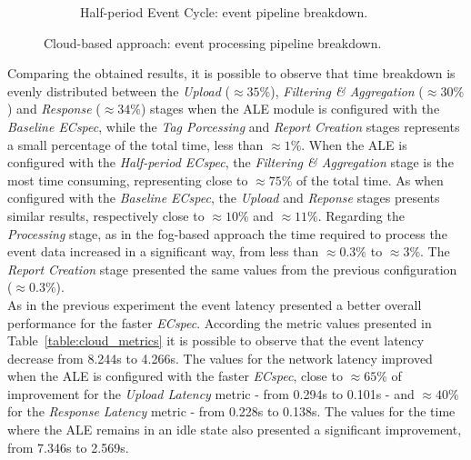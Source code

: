 \begin{figure}[ht!]
\begin{subfigure}{.5\textwidth}
    \caption{Half-period Event Cycle: event pipeline breakdown.}
    \label{fig:ecspecf_effective_half}
  \end{subfigure}
  \caption[Cloud-based approach: event processing breakdown.]{Cloud-based approach: event processing pipeline breakdown.}
  \label{fig:ecspecf_effective_breakdown}
\end{figure}

Comparing the obtained results, it is possible to observe that time breakdown is evenly distributed
between the \textit{Upload} ($\approx35\%$), \textit{Filtering \& Aggregation} ($\approx30\%$) and
\textit{Response} ($\approx34\%$) stages when the \gls{ALE} module is configured with the \textit{Baseline ECspec},
while the \textit{Tag Porcessing} and \textit{Report Creation} stages represents a small percentage of the
total time, less than $\approx1\%$. When the \gls{ALE} is configured with the \textit{Half-period ECspec},
the \textit{Filtering \& Aggregation} stage is the most time consuming, representing close to $\approx 75\%$
of the total time. As when configured with the \textit{Baseline ECspec}, the \textit{Upload} and
\textit{Reponse} stages presents similar results, respectively close to $\approx10\%$ and $\approx11\%$.
Regarding the \textit{Processing} stage, as in the fog-based approach the time required to process the
event data increased in a significant way, from less than $\approx0.3\%$ to $\approx3\%$. The
\textit{Report Creation} stage presented the same values from the previous configuration ($\approx0.3\%$).\\

As in the previous experiment the event latency presented a better overall performance for the faster \textit{ECspec}.
According the metric values presented in Table~\ref{table:cloud_metrics} it is possible to observe that the event
latency decrease from 8.244s to 4.266s. The values for the network latency improved when the \gls{ALE} is
configured with the faster \textit{ECspec}, close to $\approx65\%$ of improvement for the \textit{Upload Latency}
metric - from 0.294s to 0.101s - and $\approx40\%$ for the \textit{Response Latency} metric -
from 0.228s to 0.138s. The values for the time where the \gls{ALE} remains in an idle state also presented
a significant improvement, from 7.346s to 2.569s.\\

